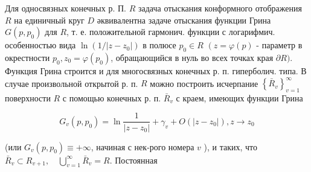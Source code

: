 \documentclass[10pt]{article}
\begin{document}
Для односвязных конечных р. П. $R$ задача отыскания конформного отображения $R$ на единичный круг $D$ әквивалентна задаче отыскания функции Грина $G\left(p, p_{0}\right)$ для $R$, т. е. положительной гармонич. функции с логарифмич. особенностью вида $\ln \left(1 /\left|z-z_{0}\right|\right)$ в полюсе $p_{0} \in R$ $\left(z=\varphi(p)\right.$ - параметр в окрестности $p_{0}, z_{0}=\varphi\left(p_{0}\right)$, обращающийся в нуль во всех точках края $\partial R)$. Функция Грина строится и для многосвязных конечных р. п. гиперболич. типа. В случае произвольной открытой р. п. $R$ можно построить исчерпание $\left\{\bar{R}_{v}\right\}_{v=1}^{\infty}$ поверхности $R$ с помощью конечных р. п. $\bar{R}_{v}$ с краем, имеющих функции Грина



\[

G_{v}\left(p, p_{0}\right)=\ln \frac{1}{\left|z-z_{0}\right|}+\gamma_{v}+O\left(\left|z-z_{0}\right|\right), z \longrightarrow z_{0}

\]



(или $G_{v}\left(p, p_{0}\right) \equiv+\infty$, начиная с нек-рого номера $v$ ), и таких, что $\bar{R}_{v} \subset R_{v+1}, \quad \bigcup_{v=1}^{\infty} \bar{R}_{v}=R$. Постоянная
\end{document}
